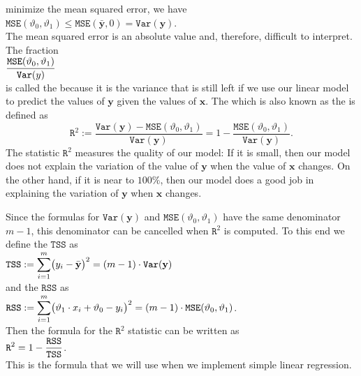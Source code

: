 minimize the mean squared error, we have
\\[0.2cm]
\hspace*{1.3cm}
$\mathtt{MSE}(\vartheta_0, \vartheta_1) \leq \mathtt{MSE}(\bar{\mathbf{y}}, 0) = \mathtt{Var}(\mathbf{y})$.
\\[0.2cm]
The mean squared error is an absolute value and, therefore, difficult to interpret.  The fraction
\\[0.2cm]
\hspace*{1.3cm}
$\displaystyle \frac{\mathtt{MSE}(\vartheta_0, \vartheta_1)}{\mathtt{Var}(y)}$
\\[0.2cm]
is called the  
because it is the variance that is still
left if we use our linear model to predict the values of $\mathbf{y}$ given the values of $\mathbf{x}$.  The
 
which is also known as the   is defined as 
\begin{equation}
  \label{eq:Rsquare}
  \mathtt{R}^2 := \frac{\mathtt{Var}(\mathbf{y}) - \mathtt{MSE}(\vartheta_0, \vartheta_1)}{\mathtt{Var}(\mathbf{y})} 
                = 1 - \frac{\mathtt{MSE}(\vartheta_0, \vartheta_1)}{\mathtt{Var}(\mathbf{y})}.
\end{equation}
The statistic $\mathtt{R}^2$ measures the quality of our
model: If it is small, then our model does not explain the variation of the value of $\mathbf{y}$ when the value of $\mathbf{x}$
changes.  On the other hand, if it is near to $100\%$, then our model does a good job in explaining the 
variation of $\mathbf{y}$ when $\mathbf{x}$ changes.

Since the formulas for $\mathtt{Var}(\mathbf{y})$ and $\mathtt{MSE}(\vartheta_0, \vartheta_1)$ have the same
denominator $m-1$, this denominator can be cancelled when $\mathtt{R}^2$ is computed.  To this
end we define the  $\mathtt{TSS}$   as
\\[0.2cm]
\hspace*{1.3cm}
$\displaystyle\mathtt{TSS} := \sum\limits_{i=1}^m \bigl(y_i - \bar{\mathbf{y}}\bigr)^2 = (m-1) \cdot \mathtt{Var}(\mathbf{y})$
\\[0.2cm]
and the   $\mathtt{RSS}$  as
\\[0.2cm]
\hspace*{1.3cm}
$\displaystyle\mathtt{RSS} := \sum\limits_{i=1}^m \bigl(\vartheta_1 \cdot x_i + \vartheta_0 - y_i\bigr)^2
                  = (m-1) \cdot \mathtt{MSE}(\vartheta_0, \vartheta_1)
$.
\\[0.2cm]
Then the formula for the $\mathtt{R}^2$ statistic can be written as
\\[0.2cm]
\hspace*{1.3cm}
$\displaystyle \mathtt{R}^2 = 1 - \frac{\mathtt{RSS}}{\mathtt{TSS}}$.
\\[0.2cm]
This is the formula that we will use when we implement simple linear regression.

